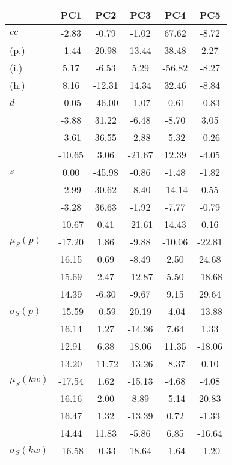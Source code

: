 \begin{table}[h!]
\begin{center}
\begin{tabular}{| l | c | c | c | c | c |}\hline
 & PC1 & PC2 & PC3 & PC4 & PC5 \\\hline
$cc$ & -2.83  & -0.79  & -1.02  & 67.62  & -8.72 \\\hline
(p.) & -1.44  & 20.98  & 13.44  & 38.48  & 2.27 \\\hline
(i.) & 5.17  & -6.53  & 5.29  & -56.82  & -8.27 \\\hline
(h.) & 8.16  & -12.31  & 14.34  & 32.46  & -8.84 \\\hline
$d$ & -0.05  & -46.00  & -1.07  & -0.61  & -0.83 \\\hline
 & -3.88  & 31.22  & -6.48  & -8.70  & 3.05 \\\hline
 & -3.61  & 36.55  & -2.88  & -5.32  & -0.26 \\\hline
 & -10.65  & 3.06  & -21.67  & 12.39  & -4.05 \\\hline
$s$ & 0.00  & -45.98  & -0.86  & -1.48  & -1.82 \\\hline
 & -2.99  & 30.62  & -8.40  & -14.14  & 0.55 \\\hline
 & -3.28  & 36.63  & -1.92  & -7.77  & -0.79 \\\hline
 & -10.67  & 0.41  & -21.61  & 14.43  & 0.16 \\\hline
$\mu_S(p)$ & -17.20  & 1.86  & -9.88  & -10.06  & -22.81 \\\hline
 & 16.15  & 0.69  & -8.49  & 2.50  & 24.68 \\\hline
 & 15.69  & 2.47  & -12.87  & 5.50  & -18.68 \\\hline
 & 14.39  & -6.30  & -9.67  & 9.15  & 29.64 \\\hline
$\sigma_S(p)$ & -15.59  & -0.59  & 20.19  & -4.04  & -13.88 \\\hline
 & 16.14  & 1.27  & -14.36  & 7.64  & 1.33 \\\hline
 & 12.91  & 6.38  & 18.06  & 11.35  & -18.06 \\\hline
 & 13.20  & -11.72  & -13.26  & -8.37  & 0.10 \\\hline
$\mu_S(kw)$ & -17.54  & 1.62  & -15.13  & -4.68  & -4.08 \\\hline
 & 16.16  & 2.00  & 8.89  & -5.14  & 20.83 \\\hline
 & 16.47  & 1.32  & -13.39  & 0.72  & -1.33 \\\hline
 & 14.44  & 11.83  & -5.86  & 6.85  & -16.64 \\\hline
$\sigma_S(kw)$ & -16.58  & -0.33  & 18.64  & -1.64  & -1.20 \\\hline

\end{tabular}
\end{center}
\end{table}
